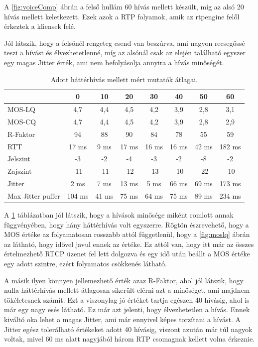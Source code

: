 A \ref{fig:voiceComp} ábrán a felső hullám 60 hívás mellett készült, míg az alsó 20 hívás 
mellett keletkezett. Ezek azok a RTP folyamok, amik az rtpengine felől érkeztek a 
kliensek felé. 

Jól látszik, hogy a felsőnél rengeteg csend van beszúrva, ami nagyon recsegőssé teszi a 
hívást és élvezhetetlenné, míg az alsónál csak az elején található egyszer egy magas 
Jitter érték, ami nem befolyásolja annyira a hívás minőségét.

\begin{table}[ht]
	\footnotesize
	\centering
	\begin{tabular}{l c c c c c c c}
		\toprule
		 & 0 & 10 & 20 & 30 & 40 & 50 & 60\\
		\midrule
		MOS-LQ & 4,7 & 4,4 & 4,5 & 4,2 & 3,9 & 2,8 & 3,1\\
		MOS-CQ & 4,7 & 4,4 & 4,5 & 4,2 & 3,9 & 2,8 & 2,9\\
		R-Faktor & 94 & 88 & 90 & 84 & 78 & 55 & 59\\
		RTT & 17 ms & 9 ms & 17 ms & 16 ms & 16 ms & 42 ms & 182 ms\\
		Jelszint & -3 & -2 & -4 & -3 & -2 & -8 & -2\\
		Zajszint & -11 & -11 & -12 & -13 & -10 & -22 & -10\\
		Jitter & 2 ms & 7 ms & 13 ms & 5 ms & 66 ms & 69 ms & 173 ms\\
		Max Jitter puffer & 104 ms & 41 ms & 75 ms & 64 ms & 75 ms & 89 ms & 234 ms\\
		\bottomrule
	\end{tabular}
	\caption{Adott háttérhívás mellett mért mutatók átlagai.}
	\label{tab:callValues}
\end{table}

A \ref{tab:callValues} táblázatban jól látszik, hogy a hívások minősége miként romlott 
annak függvényében, hogy hány háttérhívás volt egyszerre. Rögtön észrevehető, hogy a 
MOS értéke az folyamatosan rosszabb attól függetlenül, hogy a \ref{fig:moslq} ábrán az 
látható, hogy idővel javul ennek az értéke. Ez attól van, hogy itt már az összes  
értelmezhető RTCP üzenet fel lett dolgozva és egy idő után beállt a MOS értéke egy adott 
szintre, ezért folyamatos csökkenés látható. 

A másik ilyen könnyen jellemezhető érték azaz R-Faktor, ahol jól látszik, hogy nulla 
háttérhívás mellett átlagosan sikerült elérni azt a minőséget, ami majdnem tökéletesnek 
számít. Ezt a viszonylag jó értéket tartja egészen 40 hívásig, ahol is már egy nagy esés 
látható. Ez már azt jelenti, hogy élvezhetetlen a hívás. Ennek kiváltó oka lehet a magas 
Jitter, ami már ennyivel képes torzítani a hívást. A Jitter egész tolerálható értékeket 
adott 40 hívásig, viszont azután már túl nagyok voltak, mivel 60 ms alatt nagyjából három 
RTP csomagnak kellett volna érkeznie.


